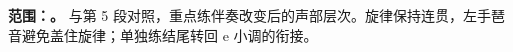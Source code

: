 \textbf{范围：\CurrentSegmentRange。} 与第 5 段对照，重点练伴奏改变后的声部层次。旋律保持连贯，左手琶音避免盖住旋律；单独练结尾转回 e 小调的衔接。
\SegmentScore
